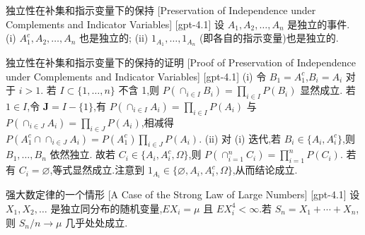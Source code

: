 \documentclass[UTF8]{ctexart}
\begin{document}
    
    
    \begin{thm}
        {独立性在补集和指示变量下的保持}
        [Preservation of Independence under Complements and Indicator Variables]
        [gpt-4.1]
        设 $A_1, A_2, \ldots, A_n$ 是独立的事件.
(i) $A_1^c, A_2, \ldots, A_n$ 也是独立的;
(ii) $1_{A_1}, \ldots, 1_{A_n}$ (即各自的指示变量)也是独立的.
    \end{thm}
    
    
    
    \begin{prf}
        {独立性在补集和指示变量下的保持的证明}
        [Proof of Preservation of Independence under Complements and Indicator Variables]
        [gpt-4.1]
        (i) 令 $B_1 = A_1^c$,$B_i = A_i$ 对于 $i > 1$.
若 $I \subset \{ 1, \ldots, n \}$ 不含 1,则 $P(\cap_{i \in I} B_i) = \prod_{i \in I} P(B_i)$ 显然成立.
若 $1 \in I$,令 $\mathbf{J} = I - \{ 1 \}$,有 $P(\cap_{i \in I} A_i) = \prod_{i \in I} P(A_i)$ 与 $P(\cap_{i \in J} A_i) = \prod_{i \in J} P(A_i)$,相减得 $P(A_1^c \cap \cap_{i \in J} A_i) = P(A_1^c) \prod_{i \in J} P(A_i)$.
(ii) 对 (i) 迭代,若 $B_i \in \{ A_i, A_i^c \}$,则 $B_1, \ldots, B_n$ 依然独立.
故若 $C_i \in \{ A_i, A_i^c, \Omega \}$,则 $P(\cap_{i=1}^n C_i) = \prod_{i=1}^n P(C_i)$.
若有 $C_i = \varnothing$,等式显然成立.注意到 $1_{A_i} \in \{ \varnothing, A_i, A_i^c, \Omega \}$,从而结论成立.
    \end{prf}
    
    
    
    \begin{thm}
        {强大数定律的一个情形}
        [A Case of the Strong Law of Large Numbers]
        [gpt-4.1]
        设 $X_{1}, X_{2}, \ldots$ 是独立同分布的随机变量,$E X_{i} = \mu$ 且 $E X_{i}^{4} < \infty$.若 $S_{n} = X_{1} + \cdots + X_{n}$,则 $S_{n}/n \to \mu$ 几乎处处成立.
    \end{thm}
    
    
    
\end{document}
